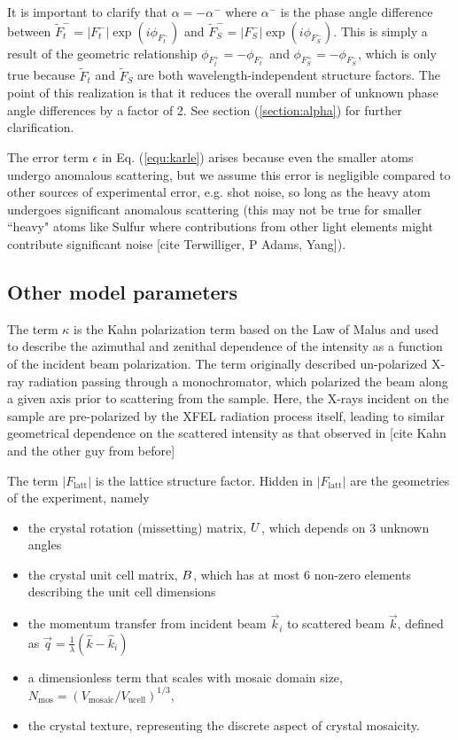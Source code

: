 \documentclass[dists.tex]{subfiles}
\begin{document}
It is important to clarify that $\alpha=-\alpha^-$ where $\alpha^-$ is the phase angle difference between  $\widetilde F_t^- = |F_t^-| \exp( i \phi_{F_t^-})$ and $\widetilde F_S^-= |F_S^-| \exp( i \phi_{F_S^-})$. This is simply a result of the geometric relationship $\phi_{F_t^+} = - \phi_{F_t^-}$ and $\phi_{F_S^+} = - \phi_{F_S^-}$, which is only true because $\widetilde F_t$ and $\widetilde F_S$ are both wavelength-independent structure factors. The point of this realization is that it reduces the overall number of unknown phase angle differences by a factor of 2. See section (\ref{section:alpha}) for further clarification.  

The error term $\epsilon$ in Eq. (\ref{equ:karle}) arises because even the smaller atoms undergo anomalous scattering, but we assume this error is negligible compared to other sources of experimental error, e.g. shot noise, so long as the heavy atom undergoes significant anomalous scattering (this may not be true for smaller ``heavy" atoms like Sulfur where contributions from other light elements might contribute significant noise [cite Terwilliger, P Adams, Yang]).  

\subsection{Other model parameters}
The term $\kappa$ is the Kahn polarization term based on the Law of Malus and used to describe the azimuthal and zenithal dependence of the intensity as a function of the incident beam polarization.  The term originally described un-polarized X-ray radiation passing through a monochromator, which polarized the beam along a given axis prior to scattering from the sample. Here, the X-rays incident on the sample are pre-polarized by the XFEL radiation process itself, leading to similar geometrical dependence on the scattered intensity as that observed in [cite Kahn and the other guy from before]

The term $|F_\text{latt}|$ is the lattice structure factor. Hidden in $|F_\text{latt}|$ are the geometries of the experiment, namely 

\begin{itemize}
\item the crystal rotation (missetting) matrix, $U$, which depends on 3 unknown angles 
\item the crystal unit cell matrix, $B$, which has at most 6 non-zero elements describing the unit cell dimensions 
\item  the momentum transfer from incident beam $\vec k_i$ to scattered beam $\vec k$, defined as $\vec q = \frac{1}{\lambda} (\hat k-  \hat{k}_i)$
\item a dimensionless term that scales with mosaic domain size, $N_\text{mos} = (V_\text{mosaic} / V_\text{ucell})^{1/3}$, 
\item the crystal texture, representing the discrete aspect of crystal mosaicity. 
\end{itemize}
\end{document}
